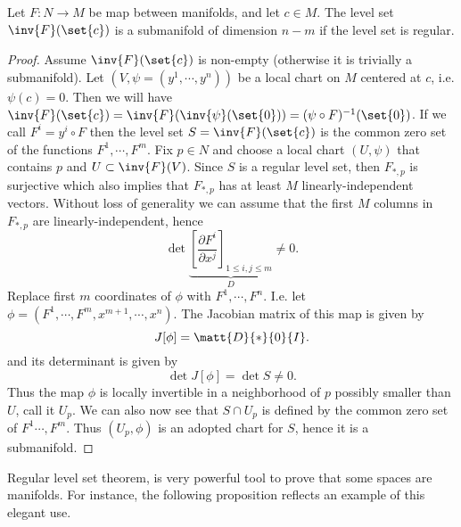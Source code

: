 \begin{theorem}
	\label{thm:regularLevelSetTheorem}
	Let $ F: N \to M $ be map between manifolds, and let $ c \in M $. The level set $ \inv{F}(\set{c}) $ is a submanifold of dimension $ n-m $ if the level set is regular. 
\end{theorem}
\begin{proof}
	Assume $ \inv{F}(\set{c}) $ is non-empty (otherwise it is trivially a submanifold). Let $ (V,\psi = (y^1,\cdots,y^n)) $ be a local chart on $ M $ centered at $ c $, i.e. $ \psi(c) = 0 $. Then we will have $ \inv{F}(\set{c}) = \inv{F}(\inv{\psi}(\set{0}))  = (\psi \circ F)^{-1}(\set{0})$. If we call $ F^i = y^i \circ F $ then the level set $ S = \inv{F}(\set{c}) $ is the common zero set of the functions $ F^1,\cdots,F^m $. Fix $ p \in N $ and choose a local chart $ (U,\psi) $ that contains $ p $ and $ U \subset \inv{F}(V) $. Since $ S $ is a regular level set, then $ F_{*,p} $ is surjective which also implies that $ F_{*,p} $ has at least $ M $ linearly-independent vectors. Without loss of generality we can assume that the first $ M $ columns in $ F_{*,p} $ are linearly-independent, hence 
	\[ \det\underbrace{\left[\frac{\partial F^i}{\partial x^j}\right]_{1\leq i,j \leq m}}_D \neq 0. \]
	Replace first $ m $ coordinates of $ \phi $ with $ F^1,\cdots,F^n $. I.e. let $ \phi = (F^1,\cdots,F^m,x^{m+1},\cdots,x^n) $. The Jacobian matrix of this map is given by
	\[ J[\phi] = \matt{D}{*}{0}{I}. \]
	and its determinant is given by \[ \det J[\phi] = \det S \neq 0 .\]
	Thus the map $ \phi $ is locally invertible in a neighborhood of $ p $ possibly smaller than $ U $, call it $ U_p $. We can also now see that $ S\cap U_p $ is defined by the common zero set of $ F^1\cdots,F^m $. Thus $ (U_p,\phi) $ is an adopted chart for $ S $, hence it is a submanifold.
\end{proof}


Regular level set theorem, is very powerful tool to prove that some spaces are manifolds. For instance, the following proposition reflects an example of this elegant use.

